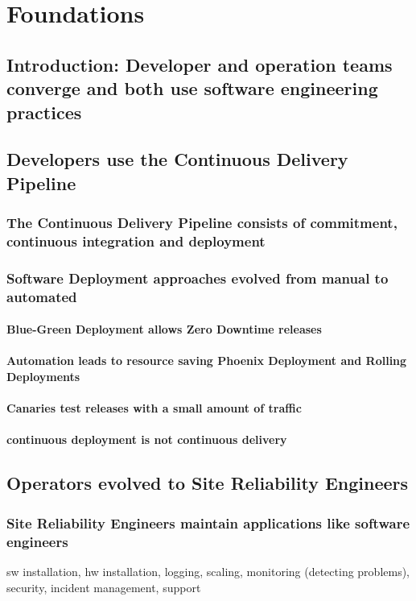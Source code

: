 \part{Foundations}
\chapter{Introduction: Developer and operation teams converge and both use software engineering practices}

\chapter{Developers use the Continuous Delivery Pipeline}
\section{The Continuous Delivery Pipeline consists of commitment, continuous integration and deployment}
\section{Software Deployment approaches evolved from manual to automated}
\subsection{Blue-Green Deployment allows Zero Downtime releases}
\subsection{Automation leads to resource saving Phoenix Deployment and Rolling Deployments}
\subsection{Canaries test releases with a small amount of traffic}
\subsection{continuous deployment is not continuous delivery}

\chapter{Operators evolved to Site Reliability Engineers}
\section{Site Reliability Engineers maintain applications like software engineers}
sw installation, hw installation, logging, scaling, monitoring (detecting problems), security, incident management, support
